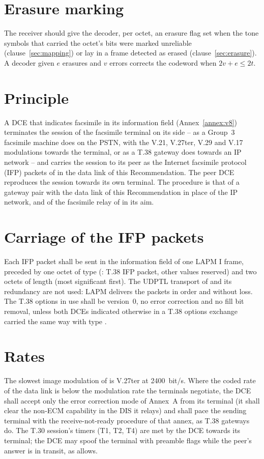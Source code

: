 \section{Erasure marking}
The receiver should give the decoder, per octet, an erasure flag set when
the tone symbols that carried the octet's bits were marked unreliable
(clause~\ref{sec:mapping}) or lay in a frame detected as erased
(clause~\ref{sec:erasure}).  A decoder given $e$ erasures and $v$ errors
corrects the codeword when $2v + e \le 2t$.

\section{Principle}
A DCE that indicates facsimile in its information field
(Annex~\ref{annex:v8}) terminates the  session of the facsimile
terminal on its side -- as a Group~3 facsimile machine does on the
PSTN, with the V.21, V.27ter, V.29 and V.17 modulations towards the
terminal, or as a T.38 gateway does towards an IP network -- and carries
the session to its peer as the Internet facsimile protocol (IFP) packets
of  in the data link of this Recommendation.  The peer DCE
reproduces the session towards its own terminal.  The procedure is that
of a  gateway pair with the data link of this Recommendation in
place of the IP network, and of the facsimile relay of  in its
aim.

\section{Carriage of the IFP packets}
Each IFP packet shall be sent in the information field of one LAPM I
frame, preceded by one octet of type (: T.38 IFP packet, other
values reserved) and two octets of length (most significant first).  The
UDPTL transport of  and its redundancy are not used: LAPM
delivers the packets in order and without loss.  The T.38 options in use
shall be version~0, no error correction and no fill bit removal, unless
both DCEs indicated otherwise in a T.38 options exchange carried the same
way with type .

\section{Rates}
The slowest image modulation of  is V.27ter at 2400~bit/s.  Where
the coded rate of the data link is below the modulation rate the
terminals negotiate, the DCE shall accept only the error correction mode
of  Annex~A from its terminal (it shall clear the non-ECM
capability in the DIS it relays) and shall pace the sending terminal with
the receive-not-ready procedure of that annex, as T.38 gateways do.  The
T.30 session's timers (T1, T2, T4) are met by the DCE towards its
terminal; the DCE may spoof the terminal with preamble flags while the
peer's answer is in transit, as  allows.

